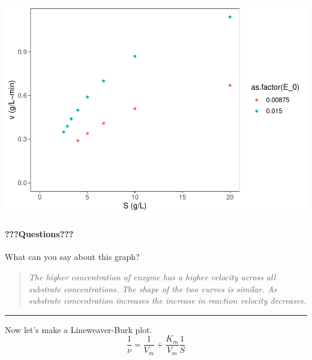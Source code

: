 \documentclass[
]{article}
\newenvironment{Shaded}{\begin{snugshade}}{\end{snugshade}}
\newcommand{\AttributeTok}[1]{\textcolor[rgb]{0.13,0.29,0.53}{#1}}
\newcommand{\DecValTok}[1]{\textcolor[rgb]{0.00,0.00,0.81}{#1}}
\newcommand{\FunctionTok}[1]{\textcolor[rgb]{0.13,0.29,0.53}{\textbf{#1}}}
\newcommand{\NormalTok}[1]{#1}
\newcommand{\OtherTok}[1]{\textcolor[rgb]{0.56,0.35,0.01}{#1}}
\newcommand{\SpecialCharTok}[1]{\textcolor[rgb]{0.81,0.36,0.00}{\textbf{#1}}}
\newcommand{\StringTok}[1]{\textcolor[rgb]{0.31,0.60,0.02}{#1}}
\begin{document}
\includegraphics{Bioprocess_Engineering_files/figure-latex/unnamed-chunk-29-1.pdf}

\hypertarget{questions-10}{%
\paragraph{???Questions???}\label{questions-10}}

What can you say about this graph?

\begin{quote}
\emph{The higher concentration of enzyme has a higher velocity across all substrate concentrations. The shape of the two curves is similar. As substrate concentration increases the increase in reaction velocity decreases.}
\end{quote}

\begin{center}\rule{0.5\linewidth}{0.5pt}\end{center}

Now let's make a Lineweaver-Burk plot.
\[\frac{1}{\nu} = \frac{1}{V_m} + \frac{K_m}{V_m} \frac{1}{S}\]

\begin{Shaded}
\end{Shaded}
\end{document}
